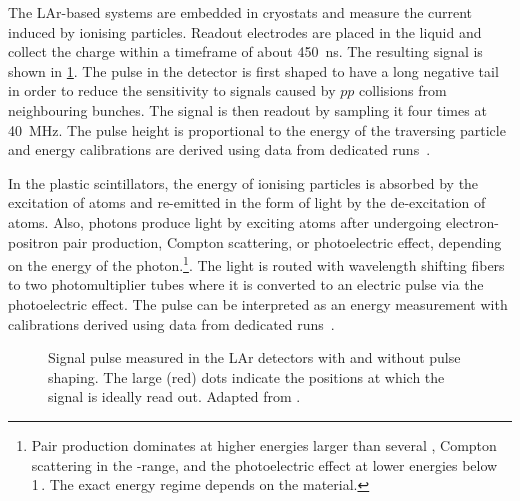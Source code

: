 The LAr-based systems are embedded in cryostats and measure the current induced by ionising particles. Readout electrodes are placed in the liquid and collect the charge within a timeframe of about \SI{450}{\nano\second}. The resulting signal is shown in \cref{fig:LAr-signal-pulse}. The pulse in the detector is first shaped to have a long negative tail in order to reduce the sensitivity to signals caused by $pp$ collisions from neighbouring bunches. The signal is then readout by sampling it four times at \SI{40}{\mega\hertz}. The pulse height is proportional to the energy of the traversing particle and energy calibrations are derived using data from dedicated runs~\cite{Abreu:1303004}.

In the plastic scintillators, the energy of ionising particles is absorbed by the excitation of atoms and re-emitted in the form of light by the de-excitation of atoms. Also, photons produce light by exciting atoms after undergoing electron-positron pair production, Compton scattering, or photoelectric effect, depending on the energy of the photon.\footnote{Pair production dominates at higher energies larger than several \MeV, Compton scattering in the \MeV-range, and the photoelectric effect at lower energies below 1\,\MeV. The exact energy regime depends on the material.}.
The light is routed with wavelength shifting fibers to two photomultiplier tubes where it is converted to an electric pulse via the photoelectric effect. The pulse can be interpreted as an energy measurement with calibrations derived using data from dedicated runs~\cite{PERF-2007-01}.

\FloatBarrier
\begin{figure}[t]
    \caption[Signal pulse measured in the ATLAS LAr detectors.]{Signal pulse measured in the LAr detectors with and without pulse shaping. The large (red) dots indicate the positions at which the signal is ideally read out. Adapted from .}
    \label{fig:LAr-signal-pulse}
\end{figure}


